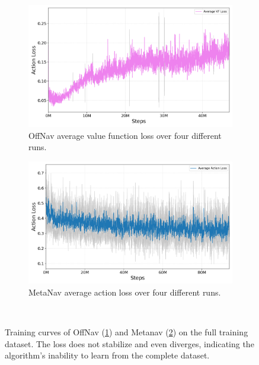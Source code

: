 \begin{figure}
    \centering
    \begin{subfigure}[b]{0.49\linewidth}
        \centering
        \includegraphics[width=\linewidth]{figures/offnav/offnav_losses_avg_std}
        \caption{OffNav average value function loss over four different runs.}
        \label{fig:training_problems_offnav}
    \end{subfigure}
    \hfill
    \begin{subfigure}[b]{0.49\linewidth}
        \centering
        \includegraphics[width=\linewidth]{figures/metanav/metanav_losses_avg_std}
        \caption{MetaNav average action loss over four different runs.}
        \label{fig:training_problems_metanav}
    \end{subfigure}~\caption[Training curves of OffNav and Metanav]{Training curves of OffNav (\ref{fig:training_problems_offnav}) and Metanav (\ref{fig:training_problems_metanav}) on the full training dataset. The loss does not stabilize and even diverges, indicating the algorithm's inability to learn from the complete dataset.}
    \label{fig:training_problems}
\end{figure}

